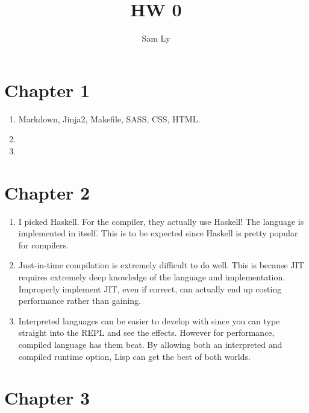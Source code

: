 \documentclass{article}
\title{HW 0}
\author{Sam Ly}
\begin{document}
\maketitle

\section*{Chapter 1}

\begin{enumerate}
    \item {
        Markdown, Jinja2, Makefile, SASS, CSS, HTML.
    }

    \item {
        
    }

    \item {
        
    }

\end{enumerate}

\section*{Chapter 2}

\begin{enumerate}
    \item {
        I picked Haskell. For the compiler, they actually use Haskell! The language 
        is implemented in itself. This is to be expected since Haskell is pretty 
        popular for compilers.
    }

    \item {
        Just-in-time compilation is extremely difficult to do well. This is because 
        JIT requires extremely deep knowledge of the language and implementation.
        Improperly implement JIT, even if correct, can actually end up costing 
        performance rather than gaining.
    }

    \item {
        Interpreted languages can be easier to develop with since you can type 
        straight into the REPL and see the effects. However for performance,
        compiled language has them beat. By allowing both an interpreted and 
        compiled runtime option, Lisp can get the best of both worlds.
    }
\end{enumerate}
\section*{Chapter 3}
\end{document}
